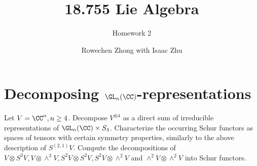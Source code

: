 \documentclass[11pt, headheight=30pt]{scrartcl}
\title{18.755 Lie Algebra}
\subtitle{Homework 2}
\author{Rowechen Zhong with Isaac Zhu}
\begin{document}
\section{Decomposing $\GL_n(\CC)$-representations}

\begin{prob}
    Let $V = \CC^n, n \geq 4$. Decompose $V^{\otimes 4}$ as a direct sum of irreducible representations of $\GL_n(\CC) \times S_4$. Characterize the occurring Schur functors as spaces of tensors with certain symmetry properties, similarly to the above description of $S^{(2,1)}V$. Compute the decompositions of $V \otimes S^3V, V \otimes \wedge^3V, S^2V \otimes S^2V, S^2V \otimes \wedge ^2V$ and $\wedge ^2V \otimes \wedge ^2V$ into Schur functors.
\end{prob}
\end{document}
